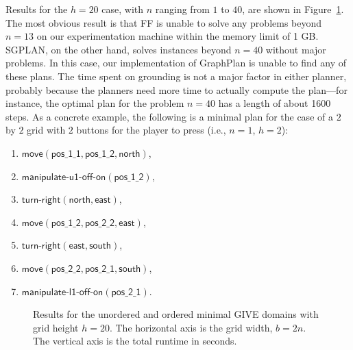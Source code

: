 Results for the $h=20$ case, with $n$ ranging from $1$ to $40$, are shown
in Figure~\ref{fig:give-minimal}. The most obvious result is that
FF is unable to solve any problems beyond $n=13$ on our experimentation
machine within the memory limit of 1 GB. SGPLAN, on the other hand, solves
instances beyond $n=40$ without major problems. In this case, our
implementation of GraphPlan is unable to find any of these plans. The time
spent on grounding is not a major factor in either planner, probably
because the planners need more time to actually compute the plan---for
instance, the optimal plan for the problem $n=40$ has a length of about
1600 steps. As a concrete example, the following is a minimal plan for the
case of a $2$ by $2$ grid with $2$ buttons for the player to press (i.e.,
$n=1$, $h=2$):

\begin{enumerate}
\item $\mathsf{move}(\mathsf{pos\_1\_1},\mathsf{pos\_1\_2}, \mathsf{north})$,
\item $\mathsf{manipulate}\textsf{-}\mathsf{u1}\textsf{-}\mathsf{off}\textsf{-}\mathsf{on}(\mathsf{pos\_1\_2})$,
\item $\mathsf{turn}\textsf{-}\mathsf{right}(\mathsf{north}, \mathsf{east})$,
\item $\mathsf{move}(\mathsf{pos\_1\_2}, \mathsf{pos\_2\_2},
  \mathsf{east})$,
\item $\mathsf{turn}\textsf{-}\mathsf{right}(\mathsf{east}, \mathsf{south})$,
\item $\mathsf{move}(\mathsf{pos\_2\_2}, \mathsf{pos\_2\_1}, \mathsf{south})$,
\item $\mathsf{manipulate}\textsf{-}\mathsf{l1}\textsf{-}\mathsf{off}\textsf{-}\mathsf{on}(\mathsf{pos\_2\_1})$.
\end{enumerate}

\begin{figure}[t]
  \caption{Results for the unordered and ordered minimal GIVE domains with grid
  height $h=20$. The horizontal axis is the grid width, $b = 2n$. The
  vertical axis is the total runtime in seconds.}
  \label{fig:give-minimal}
\end{figure}


